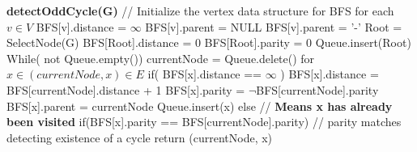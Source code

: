 \documentclass{article}
\begin{document}
  \newline
  \textbf {detectOddCycle(G)} \newline
  \hspace*{0.5cm} // Initialize the vertex data structure for BFS \newline
  \hspace*{0.5cm} for each $v \in V$ \newline
  \hspace*{1.0cm}	BFS[v].distance = $\infty$ \newline
  \hspace*{1.0cm}	BFS[v].parent = NULL \newline
  \hspace*{1.0cm}	BFS[v].parent = '-' \newline
  \hspace*{0.5cm} Root = SelectNode(G) \newline
  \hspace*{0.5cm} BFS[Root].distance = 0 \newline
  \hspace*{0.5cm} BFS[Root].parity   = 0 \newline
  \hspace*{0.5cm} Queue.insert(Root) \newline
  \hspace*{0.5cm} While( not Queue.empty())  \newline
  \hspace*{1.0cm}	currentNode = Queue.delete() \newline
  \hspace*{1.0cm}	for $x \in {(currentNode, x) \in E}$ \newline
  \hspace*{1.5cm}		if( BFS[x].distance == $\infty$ ) \newline
  \hspace*{2.0cm}			BFS[x].distance = BFS[currentNode].distance + 1 \newline
  \hspace*{2.0cm}			BFS[x].parity = $\neg$BFS[currentNode].parity \newline
  \hspace*{2.0cm}			BFS[x].parent = currentNode \newline
  \hspace*{2.0cm}			Queue.insert(x) \newline
  \hspace*{1.5cm}		else // \textbf {Means x has already been visited} \newline
  \hspace*{2.0cm}			if(BFS[x].parity == BFS[currentNode].parity) // parity matches detecting existence of a cycle \newline
  \hspace*{2.5cm}				return (currentNode, x)
\end{document}
